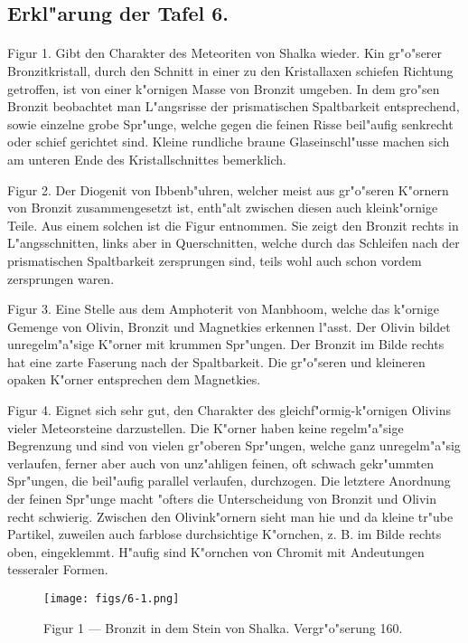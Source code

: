 \documentclass[a4paper, 11pt, oneside, polutonikogreek, german]{article}
\begin{document}
\subsection{Erkl"arung der Tafel 6.}
\paragraph{}
Figur 1. Gibt den Charakter des Meteoriten von Shalka wieder. Kin gr"o"serer Bronzitkristall, durch den Schnitt in einer zu den Kristallaxen schiefen Richtung getroffen, ist von einer k"ornigen Masse von Bronzit umgeben. In dem gro"sen Bronzit beobachtet man L"angsrisse der prismatischen Spaltbarkeit entsprechend, sowie einzelne grobe Spr"unge, welche gegen die feinen Risse beil"aufig senkrecht oder schief gerichtet sind. Kleine rundliche braune Glaseinschl"usse machen sich am unteren Ende des Kristallschnittes bemerklich.

Figur 2. Der Diogenit von Ibbenb"uhren, welcher meist aus gr"o"seren K"ornern von Bronzit zusammengesetzt ist, enth"alt zwischen diesen auch kleink"ornige Teile. Aus einem solchen ist die Figur entnommen. Sie zeigt den Bronzit rechts in L"angsschnitten, links aber in Querschnitten, welche durch das Schleifen nach der prismatischen Spaltbarkeit zersprungen sind, teils wohl auch schon vordem zersprungen waren.

Figur 3. Eine Stelle aus dem Amphoterit von Manbhoom, welche das k"ornige Gemenge von Olivin, Bronzit und Magnetkies erkennen l"asst. Der Olivin bildet unregelm"a"sige K"orner mit krummen Spr"ungen. Der Bronzit im Bilde rechts hat eine zarte Faserung nach der Spaltbarkeit. Die gr"o"seren und kleineren opaken K"orner entsprechen dem Magnetkies.

Figur 4. Eignet sich sehr gut, den Charakter des gleichf"ormig-k"ornigen Olivins vieler Meteorsteine darzustellen. Die K"orner haben keine regelm"a"sige Begrenzung und sind von vielen gr"oberen Spr"ungen, welche ganz unregelm"a"sig verlaufen, ferner aber auch von unz"ahligen feinen, oft schwach gekr"ummten Spr"ungen, die beil"aufig parallel verlaufen, durchzogen. Die letztere Anordnung der feinen Spr"unge macht "ofters die Unterscheidung von Bronzit und Olivin recht schwierig. Zwischen den Olivink"ornern sieht man hie und da kleine tr"ube Partikel, zuweilen auch farblose durchsichtige K"ornchen, z. B. im Bilde rechts oben, eingeklemmt. H"aufig sind K"ornchen von Chromit mit Andeutungen tesseraler Formen.
\clearpage

\vspace*{\fill}
\begin{figure}[H]
\centering
\texttt{[image: figs/6-1.png]}
\caption{\small Figur 1 --- Bronzit in dem Stein von Shalka. Vergr"o"serung 160.}
\end{figure}
\vspace*{\fill}
\clearpage
\end{document}
